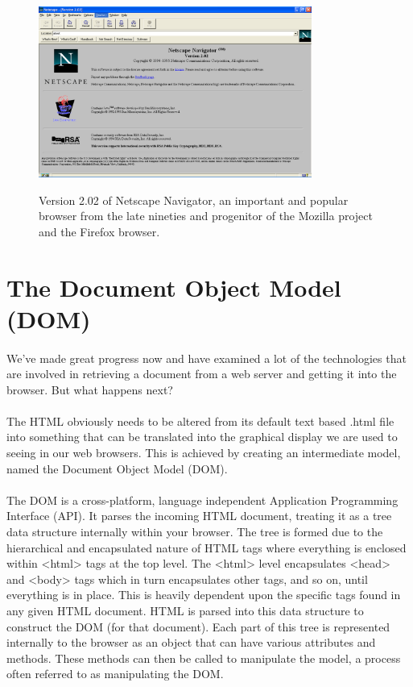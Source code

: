 \begin{figure}[H]
\centering
\includegraphics[width=0.8\textwidth]{figures/netscape-navigator-2-1995}
\label{fig:netscape-navigator-2-1995}
\caption{Version 2.02 of Netscape Navigator, an important and popular browser from the late nineties and progenitor of the Mozilla project and the Firefox browser.}
\end{figure}


\section{The Document Object Model (DOM)}
\paragraph{} We've made great progress now and have examined a lot of the technologies that are involved in retrieving a document from a web server and getting it into the browser. But what happens next?
\paragraph{} The HTML obviously needs to be altered from its default text based .html file into something that can be translated into the graphical display we are used to seeing in our web browsers. This is achieved by creating an intermediate model, named the Document Object Model (DOM).
\paragraph{} The DOM is a cross-platform, language independent Application Programming Interface (API). It parses the incoming HTML document, treating it as a tree data structure internally within your browser. The tree is formed due to the hierarchical and encapsulated nature of HTML tags where everything is enclosed within <html> tags at the top level. The <html> level encapsulates <head> and <body> tags which in turn encapsulates other tags, and so on, until everything is in place. This is heavily dependent upon the specific tags found in any given HTML document. HTML is parsed into this data structure to construct the DOM (for that document). Each part of this tree is represented internally to the browser as an object that can have various attributes and methods. These methods can then be called to manipulate the model, a process often referred to as manipulating the DOM. 
